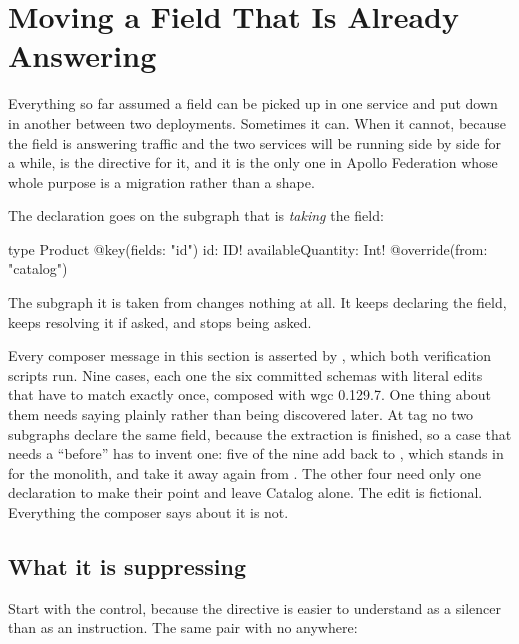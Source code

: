 \section{Moving a Field That Is Already Answering}
\label{sec:ch12-moving-a-field-that-answers}
%

Everything so far assumed a field can be picked up in one service and put down
in another between two deployments. Sometimes it can. When it cannot, because
the field is answering traffic and the two services will be running side by side
for a while,  is the directive for it, and it is the only one in
Apollo Federation whose whole purpose is a migration rather than a shape.

The declaration goes on the subgraph that is \emph{taking} the field:

\begin{graphqlsdl}[fontsize=\footnotesize]
type Product @key(fields: "id") {
  id: ID!
  availableQuantity: Int! @override(from: "catalog")
}
\end{graphqlsdl}

The subgraph it is taken from changes nothing at all. It keeps declaring the
field, keeps resolving it if asked, and stops being asked.

%
Every composer message in this section is asserted by
, which both verification scripts run. Nine
cases, each one the six committed schemas with literal edits that have to match
exactly once, composed with wgc 0.129.7. One thing about them needs saying
plainly rather than being discovered later. At tag  no two subgraphs
declare the same field, because the extraction is finished, so a case that needs
a \enquote{before} has to invent one: five of the nine add
 back to , which stands in for the
monolith, and take it away again from . The other four need only
one declaration to make their point and leave Catalog alone. The edit is
fictional. Everything the composer says about it is not.

\subsection*{What it is suppressing}

Start with the control, because the directive is easier to understand as a
silencer than as an instruction. The same pair with no  anywhere:

